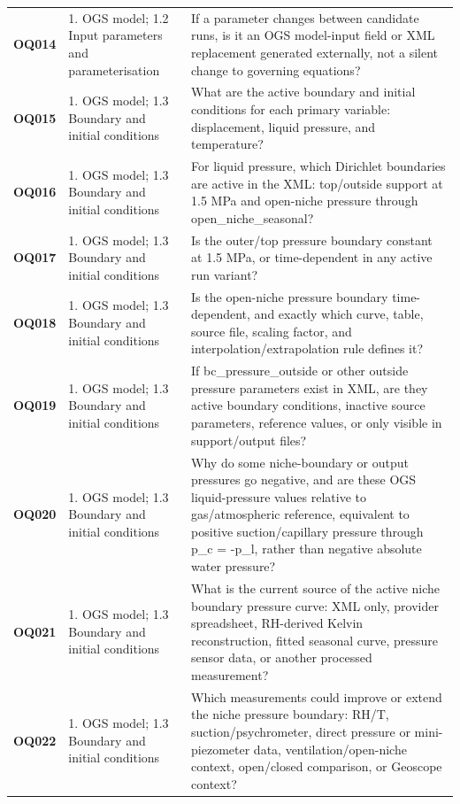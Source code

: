 \begin{longtable}{@{}L{0.10\textwidth} L{0.23\textwidth} L{0.59\textwidth}@{}}
\addlinespace[0.16em]
\textbf{OQ014} & 1. OGS model; 1.2 Input parameters and parameterisation & If a parameter changes between candidate runs, is it an OGS model-input field or XML replacement generated externally, not a silent change to governing equations?\\
\addlinespace[0.16em]
\textbf{OQ015} & 1. OGS model; 1.3 Boundary and initial conditions & What are the active boundary and initial conditions for each primary variable: displacement, liquid pressure, and temperature?\\
\addlinespace[0.16em]
\textbf{OQ016} & 1. OGS model; 1.3 Boundary and initial conditions & For liquid pressure, which Dirichlet boundaries are active in the XML: top/outside support at 1.5 MPa and open-niche pressure through open\_niche\_seasonal?\\
\addlinespace[0.16em]
\textbf{OQ017} & 1. OGS model; 1.3 Boundary and initial conditions & Is the outer/top pressure boundary constant at 1.5 MPa, or time-dependent in any active run variant?\\
\addlinespace[0.16em]
\textbf{OQ018} & 1. OGS model; 1.3 Boundary and initial conditions & Is the open-niche pressure boundary time-dependent, and exactly which curve, table, source file, scaling factor, and interpolation/extrapolation rule defines it?\\
\addlinespace[0.16em]
\textbf{OQ019} & 1. OGS model; 1.3 Boundary and initial conditions & If bc\_pressure\_outside or other outside pressure parameters exist in XML, are they active boundary conditions, inactive source parameters, reference values, or only visible in support/output files?\\
\addlinespace[0.16em]
\textbf{OQ020} & 1. OGS model; 1.3 Boundary and initial conditions & Why do some niche-boundary or output pressures go negative, and are these OGS liquid-pressure values relative to gas/atmospheric reference, equivalent to positive suction/capillary pressure through p\_c = -p\_l, rather than negative absolute water pressure?\\
\addlinespace[0.16em]
\textbf{OQ021} & 1. OGS model; 1.3 Boundary and initial conditions & What is the current source of the active niche boundary pressure curve: XML only, provider spreadsheet, RH-derived Kelvin reconstruction, fitted seasonal curve, pressure sensor data, or another processed measurement?\\
\addlinespace[0.16em]
\textbf{OQ022} & 1. OGS model; 1.3 Boundary and initial conditions & Which measurements could improve or extend the niche pressure boundary: RH/T, suction/psychrometer, direct pressure or mini-piezometer data, ventilation/open-niche context, open/closed comparison, or Geoscope context?\\

\end{longtable}
